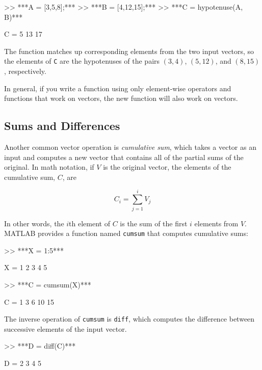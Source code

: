 
\begin{code}
>> ***A = [3,5,8];***
>> ***B = [4,12,15];***
>> ***C = hypotenuse(A, B)***

C = 5    13    17
\end{code}

The function matches up corresponding elements from the two
input vectors, so the elements of \lstinline{C} are the hypotenuses of
the pairs $(3,4)$, $(5,12)$, and $(8,15)$, respectively.

In general, if you write a function using only element-wise
operators and functions that work on vectors, the new
function will also work on vectors.


\subsection{Sums and Differences}

Another common vector operation is \emph{cumulative sum}, which takes a vector as an input and computes a new vector that contains all of the partial sums of the original.  In math notation, if $V$ is the original vector, the elements of the cumulative sum, $C$, are


\begin{equation*}
C_i = \sum_{j=1}^i V_j
\end{equation*}

In other words, the $i$th element of $C$ is the sum of the first
$i$ elements from $V$.  MATLAB provides a function named \lstinline{cumsum} that computes cumulative sums:


\begin{code}
>> ***X = 1:5***

X = 1     2     3     4     5

>> ***C = cumsum(X)***

C = 1     3     6    10    15
\end{code}

The inverse operation of \lstinline{cumsum} is \lstinline{diff}, which computes
the difference between successive elements of the input vector.


\begin{code}
>> ***D = diff(C)***

D = 2     3     4     5
\end{code}

